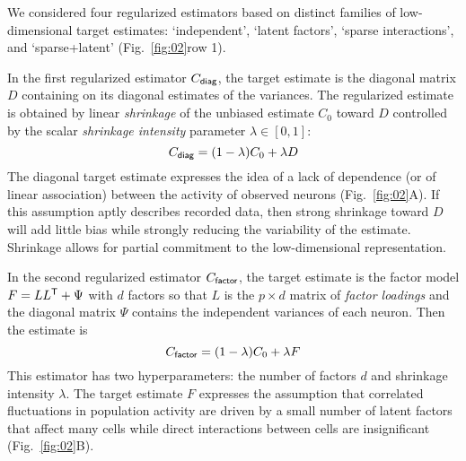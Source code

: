 \documentclass[10pt]{article}
\newcommand{\T}{{\sf T}}
\begin{document}
We considered four regularized estimators based on distinct families of low-dimensional target estimates: `independent', `latent factors', `sparse interactions', and `sparse+latent' (Fig.~\ref{fig:02}\;row 1).  

In the first regularized estimator $C_{\sf diag}$, the target estimate is the diagonal matrix $D$ containing on its diagonal estimates of the variances.
The regularized estimate is obtained by linear \emph{shrinkage} of the unbiased estimate $C_0$ toward $D$ controlled by the scalar \emph{shrinkage intensity} parameter $\lambda \in [0, 1]$:
\begin{equation}
C_{\sf diag} = (1-\lambda) C_0 + \lambda D
\end{equation}
The diagonal target estimate expresses the idea of a lack of dependence (or of linear association) between the activity of observed neurons (Fig.~\ref{fig:02}\;A).  
If this assumption aptly describes recorded data, then strong shrinkage toward $D$ will add little bias while strongly reducing the variability of the estimate. Shrinkage allows for partial commitment to the low-dimensional representation.  

In the second regularized estimator $C_{\sf factor}$, the target estimate is the factor model $F =  L L^\T + \Psi$ with $d$ factors so that $L$ is the $p\times d$ matrix of \emph{factor loadings} and the diagonal matrix $\Psi$ contains the independent variances of each neuron.
Then the estimate is 
\begin{equation}
C_{\sf factor} = (1-\lambda) C_0 + \lambda F
\end{equation}
This estimator has two hyperparameters: the number of factors $d$ and shrinkage intensity $\lambda$. The target estimate $F$ expresses the assumption that correlated fluctuations in population activity are driven by a small number of latent factors that affect many cells while direct interactions between cells are insignificant (Fig.~\ref{fig:02}\;B).   
\end{document}
